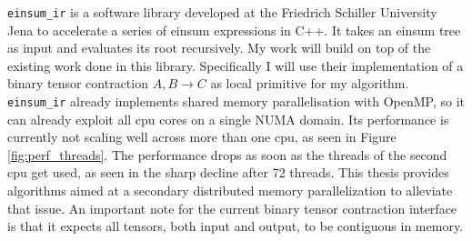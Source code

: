 \texttt{einsum\_ir}\cite{einsum_ir} is a software library developed at the Friedrich Schiller University Jena to accelerate a series of einsum expressions in C++.
It takes an einsum tree as input and evaluates its root recursively.
My work will build on top of the existing work done in this library.
Specifically I will use their implementation of a binary tensor contraction $A,B \rightarrow C$ as local primitive for my algorithm.
\texttt{einsum\_ir} already implements shared memory parallelisation with OpenMP\cite{openMP}, so it can already exploit all cpu cores on a single NUMA domain.
Its performance is currently not scaling well across more than one cpu, as seen in Figure \ref{fig:perf_threads}.
The performance drops as soon as the threads of the second cpu get used, as seen in the sharp decline after 72 threads.
This thesis provides algorithms aimed at a secondary distributed memory parallelization to alleviate that issue.
An important note for the current binary tensor contraction interface is that it expects all tensors, both input and output, to be contiguous in memory.
